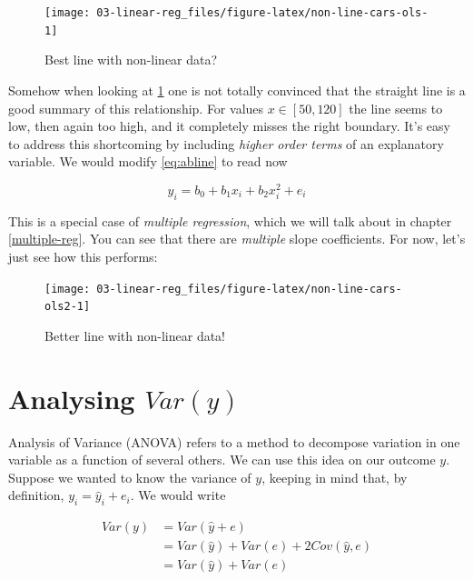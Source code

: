 \documentclass[]{book}
\begin{document}
\begin{figure}

{\centering \texttt{[image: 03-linear-reg\_files/figure-latex/non-line-cars-ols-1]} 

}

\caption{Best line with non-linear data?}\label{fig:non-line-cars-ols}
\end{figure}

Somehow when looking at \ref{fig:non-line-cars-ols} one is not totally
convinced that the straight line is a good summary of this relationship.
For values \(x\in[50,120]\) the line seems to low, then again too high,
and it completely misses the right boundary. It's easy to address this
shortcoming by including \emph{higher order terms} of an explanatory
variable. We would modify \eqref{eq:abline} to read now

\begin{equation}
y_i = b_0 + b_1 x_i + b_2 x_i^2 + e_i \label{eq:abline2}
\end{equation}

This is a special case of \emph{multiple regression}, which we will talk
about in chapter \ref{multiple-reg}. You can see that there are
\emph{multiple} slope coefficients. For now, let's just see how this
performs:

\begin{figure}

{\centering \texttt{[image: 03-linear-reg\_files/figure-latex/non-line-cars-ols2-1]} 

}

\caption{Better line with non-linear data!}\label{fig:non-line-cars-ols2}
\end{figure}

\section{\texorpdfstring{Analysing
\(Var(y)\)}{Analysing Var(y)}}\label{analysing-vary}

Analysis of Variance (ANOVA) refers to a method to decompose variation
in one variable as a function of several others. We can use this idea on
our outcome \(y\). Suppose we wanted to know the variance of \(y\),
keeping in mind that, by definition, \(y_i = \hat{y}_i + e_i\). We would
write

\begin{align}
Var(y) &= Var(\hat{y} + e)\\
 &= Var(\hat{y}) + Var(e) + 2 Cov(\hat{y},e)\\
 &= Var(\hat{y}) + Var(e) \label{eq:anova}
\end{align}
\end{document}
